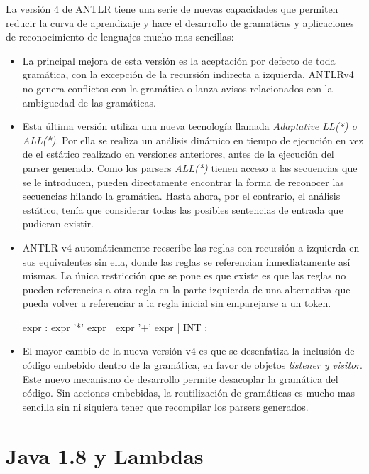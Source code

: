 {La versión 4 de ANTLR tiene una serie de nuevas capacidades que permiten reducir la curva de aprendizaje y hace el desarrollo de gramaticas y aplicaciones 
de reconocimiento de lenguajes mucho mas sencillas: 
\begin{itemize}
\item La principal mejora de esta versión es la aceptación por defecto de toda gramática, con la excepción de la recursión indirecta a izquierda. ANTLRv4 no
genera conflictos con la gramática o lanza avisos relacionados con la ambiguedad de las gramáticas.
\item Esta última versión utiliza una nueva tecnología llamada \textit{Adaptative LL(*) o ALL(*)}. Por ella se realiza un análisis dinámico en tiempo de ejecución en vez
de el estático realizado en versiones anteriores, antes de la ejecución del parser generado. Como los parsers \textit{ALL(*)} tienen acceso a las secuencias 
que se le introducen, pueden directamente encontrar la forma de reconocer las secuencias hilando la gramática. Hasta ahora, por el contrario, el análisis 
estático, tenía que considerar todas las posibles sentencias de entrada que pudieran existir.
\item ANTLR v4 automáticamente reescribe las reglas con recursión a izquierda en sus equivalentes sin ella, donde las reglas se referencian inmediatamente así mismas.
La única restricción que se pone es que existe es que las reglas no pueden referencias a otra regla en la parte izquierda de una alternativa que pueda volver
a referenciar a la regla inicial sin emparejarse a un token.
\begin{listing}[
  float=ht,
  language = ANTLRv4,
  caption  = {ALL(*)},
  label    = code:all*]
 expr : expr '*' expr 
  | expr '+' expr 
  | INT
  ;
\end{listing}
\item El mayor cambio de la nueva versión v4 es que se desenfatiza la inclusión de código embebido dentro de la gramática, en favor de objetos \textit{listener y visitor}. Este nuevo
mecanismo de desarrollo permite desacoplar la gramática del código. Sin acciones embebidas, la reutilización de gramáticas es mucho mas sencilla sin ni siquiera
tener que recompilar los parsers generados.
\end{itemize}
\cite{Parr2012}



\section{Java 1.8 y Lambdas}


}
